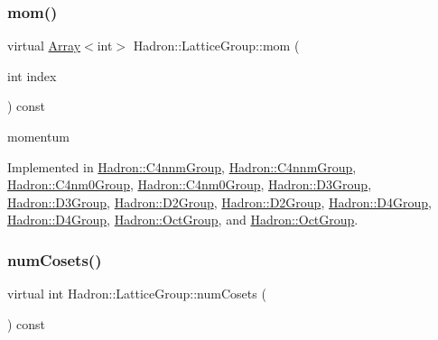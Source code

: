\subsubsection{\texorpdfstring{mom()}{mom()}\hspace{0.1cm}{\footnotesize\ttfamily [2/2]}}
{\footnotesize\ttfamily virtual \mbox{\hyperlink{classXMLArray_1_1Array}{Array}}$<$int$>$ Hadron\+::\+Lattice\+Group\+::mom (\begin{DoxyParamCaption}\item[{int}]{index }\end{DoxyParamCaption}) const\hspace{0.3cm}{\ttfamily [pure virtual]}}

momentum 

Implemented in \mbox{\hyperlink{structHadron_1_1C4nnmGroup_a7553c7f91a8dc310b37b7b5da32e98f6}{Hadron\+::\+C4nnm\+Group}}, \mbox{\hyperlink{structHadron_1_1C4nnmGroup_a7553c7f91a8dc310b37b7b5da32e98f6}{Hadron\+::\+C4nnm\+Group}}, \mbox{\hyperlink{structHadron_1_1C4nm0Group_a45599b94fa4633619247f4827e03ca23}{Hadron\+::\+C4nm0\+Group}}, \mbox{\hyperlink{structHadron_1_1C4nm0Group_a45599b94fa4633619247f4827e03ca23}{Hadron\+::\+C4nm0\+Group}}, \mbox{\hyperlink{structHadron_1_1D3Group_a5662028a7fb3554c893609148e6d3eeb}{Hadron\+::\+D3\+Group}}, \mbox{\hyperlink{structHadron_1_1D3Group_a5662028a7fb3554c893609148e6d3eeb}{Hadron\+::\+D3\+Group}}, \mbox{\hyperlink{structHadron_1_1D2Group_a65d28ef1fef635e870d60b6606b65f19}{Hadron\+::\+D2\+Group}}, \mbox{\hyperlink{structHadron_1_1D2Group_a65d28ef1fef635e870d60b6606b65f19}{Hadron\+::\+D2\+Group}}, \mbox{\hyperlink{structHadron_1_1D4Group_aeb999dc93b1a1a99ed4ffd53977a163b}{Hadron\+::\+D4\+Group}}, \mbox{\hyperlink{structHadron_1_1D4Group_aeb999dc93b1a1a99ed4ffd53977a163b}{Hadron\+::\+D4\+Group}}, \mbox{\hyperlink{structHadron_1_1OctGroup_ab3c3d81d578cac614b1ccdd456f8ea59}{Hadron\+::\+Oct\+Group}}, and \mbox{\hyperlink{structHadron_1_1OctGroup_ab3c3d81d578cac614b1ccdd456f8ea59}{Hadron\+::\+Oct\+Group}}.

\mbox{\label{structHadron_1_1LatticeGroup_afc76430f36a3a041f86d4058c59bf55e}} 
\subsubsection{\texorpdfstring{numCosets()}{numCosets()}\hspace{0.1cm}{\footnotesize\ttfamily [1/2]}}
{\footnotesize\ttfamily virtual int Hadron\+::\+Lattice\+Group\+::num\+Cosets (\begin{DoxyParamCaption}{ }\end{DoxyParamCaption}) const\hspace{0.3cm}{\ttfamily [pure virtual]}}

